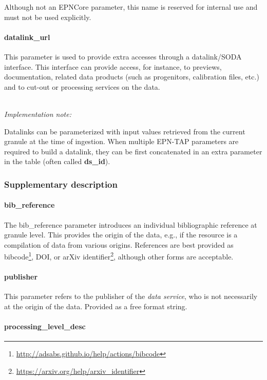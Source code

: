 \documentclass[11pt,a4paper]{ivoa}
\begin{document}
Although not an EPNCore parameter, this name is reserved for internal
use and must not be used explicitly.

\paragraph{datalink\_url}

This parameter is used to provide extra accesses through a
datalink/SODA interface.
This interface can provide access, for instance, to previews,
documentation, related data products (such as progenitors,
calibration files, etc.) and to cut-out or processing services on the data.

\textbf{\\}
\emph{Implementation note:}

Datalinks can be parameterized with input values
retrieved from the current granule at the time of ingestion.
When multiple EPN-TAP parameters are required to build a datalink,
they can be first concatenated in an extra parameter in the table
(often called \textbf{ds\_id}).

\subsubsection{Supplementary description}

\paragraph{bib\_reference}

The bib\_reference parameter introduces an individual bibliographic
reference at granule level. This provides the origin of the
data, e.g., if the resource is a compilation of data from various
origins. References are best provided as
bibcode\footnote{\url{http://adsabs.github.io/help/actions/bibcode}},
DOI, or arXiv identifier\footnote{\url{https://arxiv.org/help/arxiv_identifier}},
although other forms are acceptable.

\paragraph{publisher}

This parameter refers to the publisher of the \emph{data service}, who is not
necessarily at the origin of the data. Provided as a free format string.

\paragraph{processing\_level\_desc}
\end{document}
